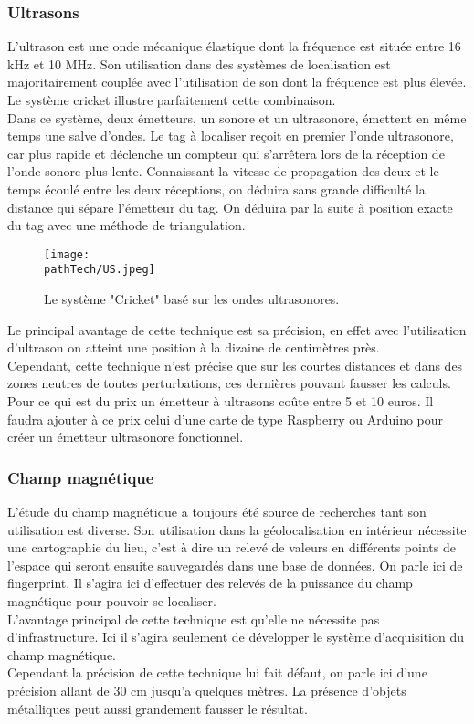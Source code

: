 \subsubsection{Ultrasons}

L'ultrason est une onde mécanique élastique dont la fréquence est située entre 16 kHz et 10 MHz. Son utilisation dans des systèmes de localisation est majoritairement couplée avec l'utilisation de son dont la fréquence est plus élevée.
Le système cricket illustre parfaitement cette combinaison.
\\
Dans ce système, deux émetteurs, un sonore et un ultrasonore, émettent en même temps une salve d'ondes.
Le tag à localiser reçoit en premier l'onde ultrasonore, car plus rapide et déclenche un compteur qui s'arrêtera lors de la réception de l'onde sonore plus lente.
Connaissant la vitesse de propagation des deux et le temps écoulé entre les deux réceptions, on déduira sans grande difficulté la distance qui sépare l'émetteur du tag.
On déduira par la suite à position exacte du tag avec une méthode de triangulation.
\begin{figure}[H]
    \centering
    \texttt{[image: \\pathTech/US.jpeg]}
    \caption{Le système "Cricket" basé sur les ondes ultrasonores.}
\end{figure}
Le principal avantage de cette technique est sa précision, en effet avec l'utilisation d'ultrason on atteint une position à la dizaine de centimètres près.
\medskip
\\
Cependant, cette technique n'est précise que sur les courtes distances et dans des zones neutres de toutes perturbations, ces dernières pouvant fausser les calculs.
\medskip
\\
Pour ce qui est du prix un émetteur à ultrasons coûte entre 5 et 10 euros. Il faudra ajouter à ce prix celui d'une carte de type Raspberry ou Arduino pour créer un émetteur ultrasonore fonctionnel. 
\subsubsection{Champ magnétique}
L'étude du champ magnétique a toujours été source de recherches tant son utilisation est diverse.
Son utilisation dans la géolocalisation en intérieur nécessite une cartographie du lieu, c'est à dire un relevé de valeurs en différents points de l'espace qui seront ensuite sauvegardés dans une base de données. 
On parle ici de fingerprint.
Il s'agira ici d'effectuer des relevés de la puissance du champ magnétique pour pouvoir se localiser.
\medskip
\\
L'avantage principal de cette technique est qu’elle ne nécessite pas d'infrastructure. Ici il s'agira seulement de développer le système d'acquisition du champ magnétique.
\medskip
\\
Cependant la précision de cette technique lui fait défaut, on parle ici d'une précision allant de 30 cm jusqu'a quelques mètres. La présence d'objets métalliques peut aussi grandement fausser le résultat.


